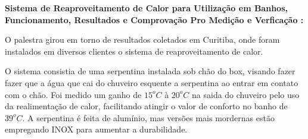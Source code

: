 
\textbf{Sistema de Reaproveitamento de Calor para Utilização em Banhos,
Funcionamento, Resultados e Comprovação Pro Medição e Verficação :}

O palestra girou em torno de resultados coletados em Curitiba, onde foram
instalados em diversos clientes o sistema de reaproveitamento de calor.

O sistema consistia de uma serpentina instalada sob chão do box, visando fazer
fazer que a água que cai do chuveiro esquente a serpentina ao entrar em contato
com o chão. Foi medido um ganho de $15^oC$ à $20^oC$ na saida do chuveiro pelo
uso da realimentação de calor, facilitando atingir o valor de conforto no banho
de $39^oC$. A serpentina é feita de alumínio, mas versões mais mordernas estão
empregando INOX para aumentar a durabilidade.
